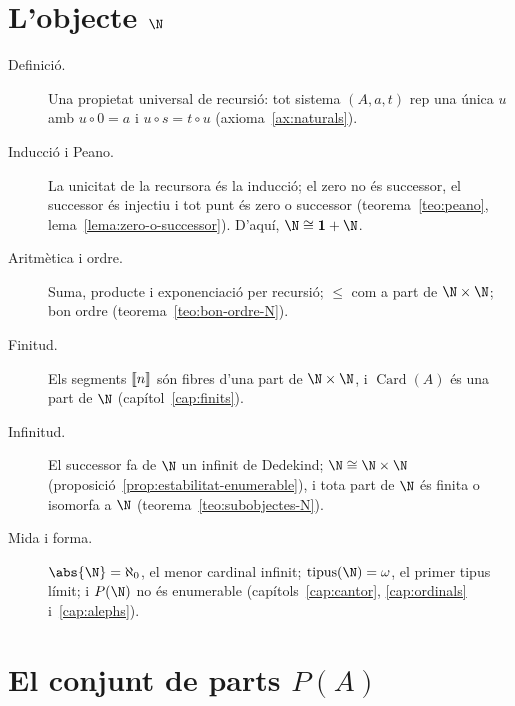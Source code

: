 \section*{\texorpdfstring{L'objecte \(\N\)}{L'objecte N}}

\begin{description}
\item[Definició.] Una propietat universal de recursió: tot sistema
\((A,a,t)\) rep una única \(u\) amb \(u\circ0=a\) i \(u\circ s=t\circ u\)
(axioma~\ref{ax:naturals}).
\item[Inducció i Peano.] La unicitat de la recursora és la inducció; el
zero no és successor, el successor és injectiu i tot punt és zero o
successor (teorema~\ref{teo:peano}, lema~\ref{lema:zero-o-successor}).
D'aquí, \(\N\cong\mathbf1+\N\).
\item[Aritmètica i ordre.] Suma, producte i exponenciació per recursió;
\(\le\) com a part de \(\N\times\N\); bon ordre
(teorema~\ref{teo:bon-ordre-N}).
\item[Finitud.] Els segments \(\llbracket n\rrbracket\) són fibres d'una part de
\(\N\times\N\), i \(\operatorname{Card}(A)\) és una part de \(\N\)
(capítol~\ref{cap:finits}).
\item[Infinitud.] El successor fa de \(\N\) un infinit de Dedekind;
\(\N\cong\N\times\N\) (proposició~\ref{prop:estabilitat-enumerable}), i tota
part de \(\N\) és finita o isomorfa a \(\N\)
(teorema~\ref{teo:subobjectes-N}).
\item[Mida i forma.] \(\abs{\N}=\aleph_0\), el menor cardinal infinit;
\(\operatorname{tipus}(\N)=\omega\), el primer tipus límit; i
\(P(\N)\) no és enumerable (capítols~\ref{cap:cantor}, \ref{cap:ordinals}
i~\ref{cap:alephs}).
\end{description}

\section*{\texorpdfstring{El conjunt de parts \(P(A)\)}{El conjunt de parts P(A)}}

